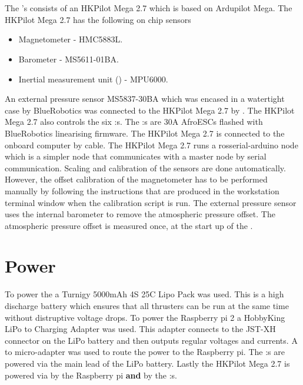 \section{\abbrROV \abbrIO}
The \abbrROV's \abbrIO consists of an HKPilot Mega 2.7 which is based on Ardupilot Mega. The HKPilot Mega 2.7 has the following on chip sensors
\begin{itemize}
    \item Magnetometer - HMC5883L.
    \item Barometer - MS5611-01BA.
    \item Inertial measurement unit (\abbrIMU) - MPU6000.
\end{itemize}
An external pressure sensor MS5837-30BA which was encased in a watertight case by BlueRobotics was connected to the HKPilot Mega 2.7 by \abbrIC.
The HKPilot Mega 2.7 also controls the six \abbrESC:s. The \abbrESC:s are 30A AfroESCs flashed with BlueRobotics linearising firmware. The HKPilot Mega 2.7 is connected to the onboard computer by \abbrUSB cable. The HKPilot Mega 2.7 runs a rosserial-arduino node which is a simpler \abbrROS node that communicates with a master node by serial communication. Scaling and calibration of the sensors are done automatically. However, the offset calibration of the magnetometer has to be performed manually by following the instructions that are produced in the workstation terminal window when the calibration script is run. The external pressure sensor uses the internal barometer to remove the atmospheric pressure offset. The atmospheric pressure offset is measured once, at the start up of the \abbrROV.

\section{Power}
To power the \abbrROV a Turnigy 5000mAh 4S 25C Lipo Pack was used. This is a high discharge battery which ensures that all thrusters can be run at the same time without distruptive voltage drops.
To power the Raspberry pi 2 a HobbyKing LiPo to \abbrUSB Charging Adapter was used. This adapter connects to the JST-XH connector on the LiPo battery and then outputs regular \abbrUSB voltages and currents. A \abbrUSB to micro-\abbrUSB adapter was used to route the power to the Raspberry pi. 
The \abbrESC:s are powered via the main lead of the LiPo battery. Lastly the HKPilot Mega 2.7 is powered via \abbrUSB by the Raspberry pi \textbf{and} by the \abbrESC:s. 

